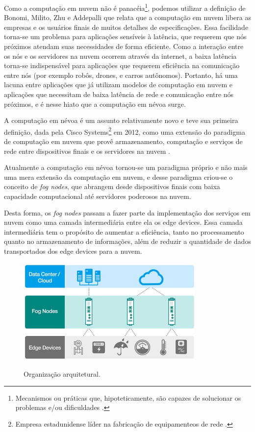 Como a computação em nuvem não é panacéia\footnote{Mecanismos ou práticas que, hipoteticamente, são capazes de solucionar os problemas e/ou dificuldades \cite{definition:panaceia}.}, podemos utilizar a definição de Bonomi, Milito, Zhu e Addepalli \cite{Bonomi:2012} que relata que a computação em nuvem libera as empresas e os usuários finais de muitos detalhes de especificações.
Essa facilidade torna-se um problema para aplicações sensíveis à latência, que requerem que nós próximos atendam suas necessidades de forma eficiente. 
Como a interação entre os nós e os servidores na nuvem ocorrem através da internet, a baixa latência torna-se indispensável para aplicações que requerem eficiência na comunicação entre nós (por exemplo robôs, drones, e carros autônomos).
Portanto, há uma lacuna entre aplicações que já utilizam modelos de computação em nuvem e aplicações que necessitam de baixa latência de rede e comunicação entre nós próximos, e é nesse hiato que a computação em névoa surge.

A computação em névoa é um assunto relativamente novo e teve sua primeira definição, dada pela Cisco Systems\footnote{Empresa estadunidense líder na fabricação de equipamenteos de rede \cite{ciscoSystems}.} em 2012, como uma extensão do paradigma de computação em nuvem que provê armazenamento, computação e serviços de rede entre dispositivos finais e os servidores na nuvem \cite{DBLP:journals/corr/RomanLM16}. 

Atualmente a computação em névoa tornou-se um paradigma próprio e não mais uma mera extensão da computação em nuvem, e desse
paradigma criou-se o conceito de \textit{fog nodes}, que abrangem desde dispositivos finais com baixa capacidade computacional até servidores poderosos na nuvem.

Desta forma, os \textit{fog nodes} passam a fazer parte da implementação dos serviços em nuvem como uma camada intermediária entre ela os edge devices.
Essa camada intermediária tem o propósito de aumentar a eficiência, tanto no processamento quanto no armazenamento de informações, além de reduzir a quantidade de dados transportados dos edge devices para a nuvem\cite{fogdefinition:2016}.


\begin{figure}[htb!]
    \centering\includegraphics[width=.5\textwidth]{fig1.pdf}
    \caption
    {\label{fig:fig1} Organização arquitetural.} \cite{archfog:2017}
\end{figure}

